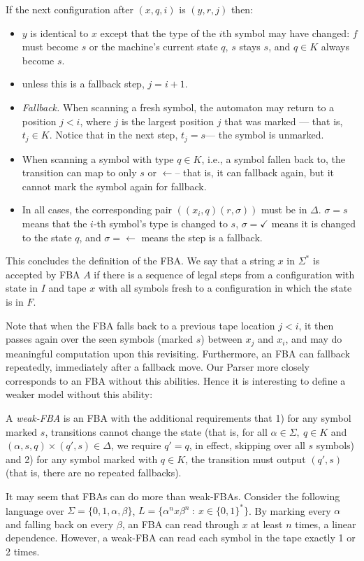 \documentclass[11pt]{article}
\begin{document}
If the next configuration after $(x,q,i)$ is $(y,r,j)$ then:
\begin{itemize}
    \item $y$ is identical to $x$ except that the type of the $i$th symbol may have changed: $f$ must become $s$ or the machine's current state $q$, $s$ stays $s$, and $q \in K$ always become $s$.
    \item unless this is a fallback step, $j=i+1$.
    \item {\em Fallback.}  When scanning a fresh symbol, the automaton may return to a position $j<i$, where $j$ is the largest position $j$ that was marked --- that is, $t_j \in K$.
    Notice that in the next step, $t_j=s$--- the symbol is unmarked.
    \item When scanning a symbol with type $q \in K$, i.e., a symbol fallen back to, the transition can map to only $s$ or $\leftarrow$-- that is, it can fallback again, but it cannot mark the symbol again for fallback.
    \item In all cases, the corresponding pair $((x_i,q)(r,\sigma))$ must be in $\Delta$. $\sigma=s$ means that the $i$-th symbol's type is changed to $s$, $\sigma=\checkmark$ means it is changed to the state $q$, and $\sigma=\leftarrow$ means the step is a fallback.
\end{itemize}
This concludes the definition of the FBA.
We say that a string $x$ in $\Sigma^*$ is accepted by FBA $A$ if there is a sequence of legal steps from a configuration with state in $I$ and tape $x$ with all symbols fresh to a configuration in which the state is in $F$. 

Note that when the FBA falls back to a previous tape location $j < i$, it then passes again over the seen symbols (marked $s$) between $x_j$ and $x_i$, and may do meaningful computation upon this revisiting. Furthermore, an FBA can fallback repeatedly, immediately after a fallback move. Our Parser more closely corresponds to an FBA without this abilities. Hence it is interesting to define a weaker model without this ability:

A {\em weak-FBA} is an FBA with the additional requirements that 1) for any symbol marked $s$, transitions cannot change the state (that is, for all $\alpha \in \Sigma,~q\in K$ and $(\alpha,s,q)\times(q',s) \in \Delta$, we require $q' = q$, in effect, skipping over all $s$ symbols) and 2) for any symbol marked with $q \in K$, the transition must output $(q',s)$ (that is, there are no repeated fallbacks). 

It may seem that FBAs can do more than weak-FBAs. Consider the following language over $\Sigma = \{0,1,\alpha,\beta\}$, $L = \{\alpha^n x \beta^n~:~x \in \{0,1\}^*\}$. By marking every $\alpha$ and falling back on every $\beta$, an FBA can read through $x$ at least $n$ times, a linear dependence. However, a weak-FBA can read each symbol in the tape exactly 1 or 2 times.
\end{document}

